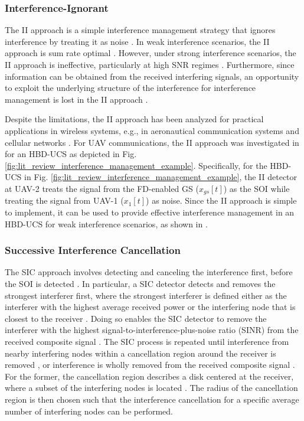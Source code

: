 \subsubsection{Interference-Ignorant}
The II approach is a simple interference management strategy that ignores interference by treating it as noise \cite{ernest2019outage, tan2018joint, ernest2019power, etkin2008gaussian, sirigina2016symbol, sirigina2016full}. In weak interference scenarios, the II approach is sum rate optimal \cite{sirigina2016symbol}. However, under strong interference scenarios, the II approach is ineffective, particularly at high SNR regimes \cite{ernest2019outage}. Furthermore, since information can be obtained from the received interfering signals, an opportunity to exploit the underlying structure of the interference for interference management is lost in the II approach \cite{etkin2008gaussian}. 

Despite the limitations, the II approach has been analyzed for practical applications in wireless systems, e.g., in aeronautical communication systems \cite{ernest2019outage} and cellular networks \cite{sirigina2016full, bithas2015mobile}. For UAV communications, the II approach was investigated in \cite{tan2018ricianShad, tan2018joint, ernest2019power} for an HBD-UCS as depicted in Fig. \ref{fig:lit_review_interference_management_example}. Specifically, for the HBD-UCS in Fig. \ref{fig:lit_review_interference_management_example}, the II detector at UAV-2 treats the signal from the FD-enabled GS ($x_{gs}[t]$) as the SOI while treating the signal from UAV-1 ($x_1[t]$) as noise. Since the II approach is simple to implement, it can be used to provide effective interference management in an HBD-UCS for weak interference scenarios, as shown in \cite{tan2018joint, tan2018ricianShad}.

\subsubsection{Successive Interference Cancellation}
The SIC approach involves detecting and canceling the interference first, before the SOI is detected \cite{ernest2019outage, tan2018joint, ernest2019hybrid}. In particular, a SIC detector detects and removes the strongest interferer first, where the strongest interferer is defined either as the interferer with the highest average received power or the interfering node that is closest to the receiver \cite{weber2007transmission}. Doing so enables the SIC detector to remove the interferer with the highest signal-to-interference-plus-noise ratio (SINR) from the received composite signal \cite{weber2007transmission, qu2014understanding}. The SIC process is repeated until interference from nearby interfering nodes within a cancellation region around the receiver is removed \cite{weber2007transmission}, or interference is wholly removed from the received composite signal \cite{qu2014understanding}. For the former, the cancellation region describes a disk centered at the receiver, where a subset of the interfering nodes is located \cite{weber2007transmission}. The radius of the cancellation region is then chosen such that the interference cancellation for a specific average number of interfering nodes can be performed.

